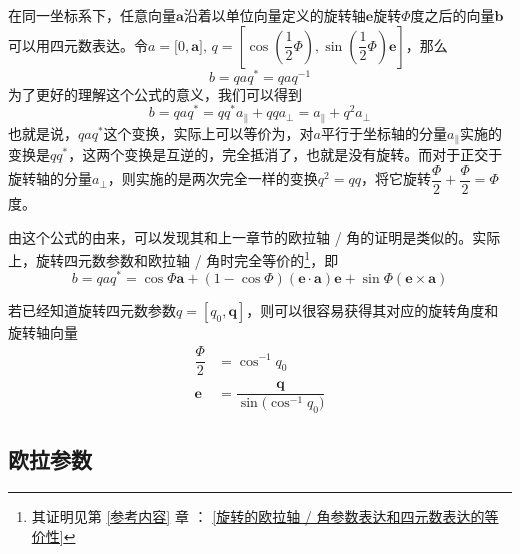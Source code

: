 {
	在同一坐标系下，任意向量$\bm{a}$沿着以单位向量定义的旋转轴$\bm{e}$旋转$\varPhi$度之后的向量$\bm{b}$可以用四元数表达。令$a = \big[ 0, \bm{a} \big], \, q = \left[ \cos \left(\dfrac{1}{2} \varPhi \right), \sin \left(\dfrac{1}{2} \varPhi \right) \bm{e} \right]$，那么
	\begin{equation}
		b = q a q^* = q a q^{-1}
	\end{equation}
	为了更好的理解这个公式的意义，我们可以得到\footnotemark[2]
	\begin{equation}
		b = q a q^* = q q^* a_\parallel + qqa_\perp = a_\parallel + q^2 a_\perp
		\label{旋转四元数的几何意义}
	\end{equation}
	也就是说，$qaq^*$这个变换，实际上可以等价为，对$a$平行于坐标轴的分量$a_\parallel$实施的变换是$qq^*$，这两个变换是互逆的，完全抵消了，也就是没有旋转。而对于正交于旋转轴的分量$a_\perp$，则实施的是两次完全一样的变换$q^2 = qq$，将它旋转$\dfrac{\varPhi}{2} + \dfrac{\varPhi}{2} = \varPhi$度。
}


由这个公式的由来，可以发现其和上一章节的欧拉轴 / 角的证明是类似的。实际上，旋转四元数参数和欧拉轴 / 角时完全等价的\footnote[3]{其证明见第 \ref{参考内容} 章 ： \ref{旋转的欧拉轴 / 角参数表达和四元数表达的等价性} }，即
\begin{equation}
	b = qaq^* = \cos \varPhi \bm{a} + ( 1 - \cos \varPhi ) (\bm{e} \cdot \bm{a})\bm{e} + \sin \varPhi(\bm{e} \times \bm{a})
\end{equation}

若已经知道旋转四元数参数$q=[q_0, \bm{q}]$，则可以很容易获得其对应的旋转角度和旋转轴向量
\begin{align}
	\dfrac{\varPhi}{2} &= \cos^{-1} q_0 \\
	\bm{e} &= \dfrac{\bm{q}}{\sin \big( \cos^{-1} q_0 \big)}
\end{align}


\subsection{欧拉参数}
\sssection[欧拉参数的定义和表示]

